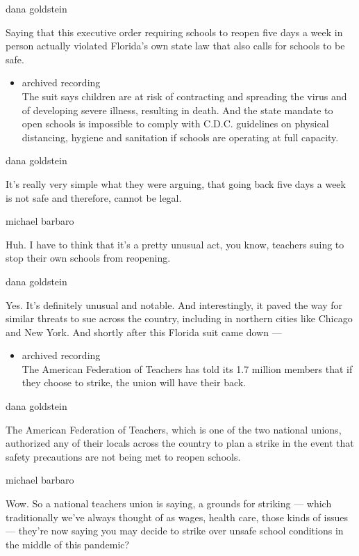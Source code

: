 dana goldstein

Saying that this executive order requiring schools to reopen five days a
week in person actually violated Florida's own state law that also calls
for schools to be safe.

\begin{itemize}
\tightlist
\item
  archived recording\\
  The suit says children are at risk of contracting and spreading the
  virus and of developing severe illness, resulting in death. And the
  state mandate to open schools is impossible to comply with C.D.C.
  guidelines on physical distancing, hygiene and sanitation if schools
  are operating at full capacity.
\end{itemize}

dana goldstein

It's really very simple what they were arguing, that going back five
days a week is not safe and therefore, cannot be legal.

michael barbaro

Huh. I have to think that it's a pretty unusual act, you know, teachers
suing to stop their own schools from reopening.

dana goldstein

Yes. It's definitely unusual and notable. And interestingly, it paved
the way for similar threats to sue across the country, including in
northern cities like Chicago and New York. And shortly after this
Florida suit came down ---

\begin{itemize}
\tightlist
\item
  archived recording\\
  The American Federation of Teachers has told its 1.7 million members
  that if they choose to strike, the union will have their back.
\end{itemize}

dana goldstein

The American Federation of Teachers, which is one of the two national
unions, authorized any of their locals across the country to plan a
strike in the event that safety precautions are not being met to reopen
schools.

michael barbaro

Wow. So a national teachers union is saying, a grounds for striking ---
which traditionally we've always thought of as wages, health care, those
kinds of issues --- they're now saying you may decide to strike over
unsafe school conditions in the middle of this pandemic?

